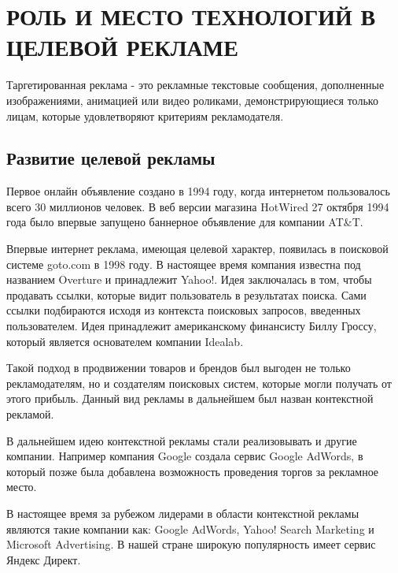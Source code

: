 \chapter{РОЛЬ И МЕСТО ТЕХНОЛОГИЙ В ЦЕЛЕВОЙ РЕКЛАМЕ}

Таргетированная реклама - это рекламные текстовые сообщения, дополненные изображениями, анимацией или видео роликами, демонстрирующиеся только лицам, которые удовлетворяют критериям рекламодателя.

\section{Развитие целевой рекламы}

Первое онлайн объявление создано в 1994 году, когда интернетом пользовалось всего 30 миллионов человек. В веб версии магазина HotWired 27 октября 1994 года было впервые запущено баннерное объявление для компании  AT\&T.\cite{kumar2016evolution}

Впервые интернет реклама, имеющая целевой характер, появилась в поисковой системе goto.com в 1998 году. В настоящее время компания известна под названием Overture и принадлежит Yahoo!. Идея заключалась в том, чтобы продавать ссылки, которые видит пользователь в результатах поиска. Сами ссылки подбираются исходя из контекста поисковых запросов, введенных пользователем. Идея принадлежит американскому финансисту Биллу Гроссу, который является основателем компании Idealab.\cite{wang2016display} 

Такой подход в продвижении товаров и брендов был выгоден не только рекламодателям, но и создателям поисковых систем, которые могли получать от этого прибыль. Данный вид рекламы в дальнейшем был назван контекстной рекламой.

В дальнейшем идею контекстной рекламы стали реализовывать и другие компании. Например компания Google создала сервис Google AdWords, в который позже была добавлена возможность проведения торгов за рекламное место.

В настоящее время за рубежом лидерами в области контекстной рекламы являются такие компании как: Google AdWords, Yahoo! Search Marketing и Microsoft Advertising. В нашей стране широкую популярность имеет сервис Яндекс Директ.

